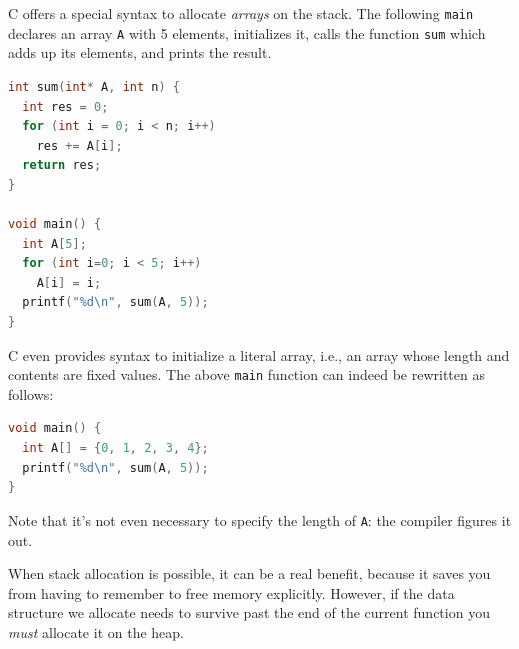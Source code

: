 C offers a special syntax to allocate \emph{arrays} on the stack.  The
following \lstinline'main' declares an array \lstinline'A' with 5
elements, initializes it, calls the function \lstinline'sum' which
adds up its elements, and prints the result.
\begin{lstlisting}[language=c]
int sum(int* A, int n) {
  int res = 0;
  for (int i = 0; i < n; i++)
    res += A[i];
  return res;
}

void main() {
  int A[5];
  for (int i=0; i < 5; i++)
    A[i] = i;
  printf("%d\n", sum(A, 5));
}
\end{lstlisting}
C even provides syntax to initialize a literal array, i.e., an array
whose length and contents are fixed values.  The above
\lstinline'main' function can indeed be rewritten as follows:
\begin{lstlisting}[language=c]
void main() {
  int A[] = {0, 1, 2, 3, 4};
  printf("%d\n", sum(A, 5));
}
\end{lstlisting}
Note that it's not even necessary to specify the length of
\lstinline'A': the compiler figures it out.


\medskip
When stack allocation is possible, it can be a real benefit,
because it saves you from having to remember to free memory explicitly.
However, if the data structure we allocate needs to
survive past the end of the current function you \emph{must} allocate
it on the heap.
